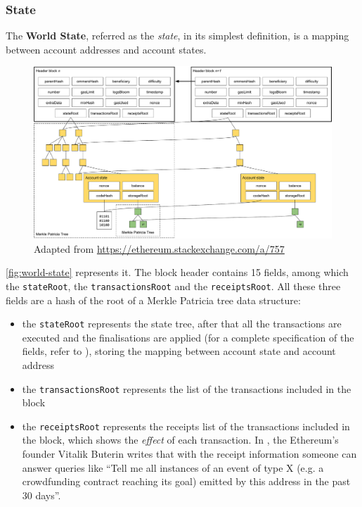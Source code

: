 \subsubsection{State}
\label{sec:world-state}

The \textbf{World State}, referred as the \emph{state}, in its simplest
definition, is a mapping between account addresses and account states.

\begin{figure}[h]
  \centering
  \includegraphics[width=\textwidth]{./res/img/world-state.pdf}
  {Adapted from \url{https://ethereum.stackexchange.com/a/757}}
\label{fig:world-state}
\end{figure}

\autoref{fig:world-state} represents it. The block header contains 15 fields,
among which the \verb+stateRoot+, the \verb+transactionsRoot+ and the
\verb+receiptsRoot+. All these three fields are a hash of the root of a Merkle
Patricia tree data structure:

\begin{itemize}
  \item the \verb+stateRoot+ represents the state tree, after that all the
  transactions are executed and the finalisations are applied (for a complete
  specification of the fields, refer to \cite{wood2018ethereum}), storing the
  mapping between account state and account address
  \item the \verb+transactionsRoot+ represents the list of the transactions
  included in the block
  \item the \verb+receiptsRoot+ represents the receipts list of the transactions
  included in the block, which shows the \emph{effect} of each transaction. In
  \cite{merklingethereum}, the Ethereum's founder Vitalik Buterin writes that
  with the receipt information someone can answer queries like ``Tell me all
  instances of an event of type X (e.g. a crowdfunding contract reaching its
  goal) emitted by this address in the past 30 days''.
\end{itemize}

